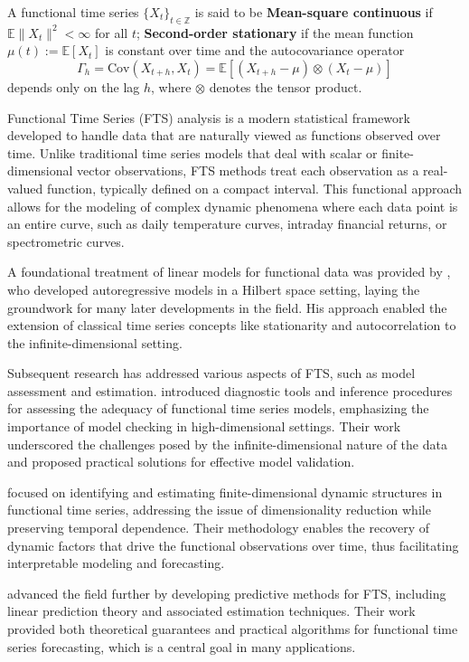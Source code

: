 \documentclass[article]{abntex2}
\begin{document}
A functional time series $\{X_t\}_{t \in \mathbb{Z}}$ is said to be \textbf{Mean-square continuous} if $\mathbb{E}\|X_t\|^2 < \infty$ for all $t$; \textbf{Second-order stationary} if the mean function $\mu(t) := \mathbb{E}[X_t]$ is constant over time and the autocovariance operator 
    \[
    \Gamma_h = \text{Cov}(X_{t+h}, X_t) = \mathbb{E}[(X_{t+h} - \mu) \otimes (X_t - \mu)]
    \]
    depends only on the lag $h$, where $\otimes$ denotes the tensor product.


Functional Time Series (FTS) analysis is a modern statistical framework developed to handle data that are naturally viewed as functions observed over time. Unlike traditional time series models that deal with scalar or finite-dimensional vector observations, FTS methods treat each observation as a real-valued function, typically defined on a compact interval. This functional approach allows for the modeling of complex dynamic phenomena where each data point is an entire curve, such as daily temperature curves, intraday financial returns, or spectrometric curves.

A foundational treatment of linear models for functional data was provided by , who developed autoregressive models in a Hilbert space setting, laying the groundwork for many later developments in the field. His approach enabled the extension of classical time series concepts like stationarity and autocorrelation to the infinite-dimensional setting.

Subsequent research has addressed various aspects of FTS, such as model assessment and estimation.  introduced diagnostic tools and inference procedures for assessing the adequacy of functional time series models, emphasizing the importance of model checking in high-dimensional settings. Their work underscored the challenges posed by the infinite-dimensional nature of the data and proposed practical solutions for effective model validation.

 focused on identifying and estimating finite-dimensional dynamic structures in functional time series, addressing the issue of dimensionality reduction while preserving temporal dependence. Their methodology enables the recovery of dynamic factors that drive the functional observations over time, thus facilitating interpretable modeling and forecasting.

 advanced the field further by developing predictive methods for FTS, including linear prediction theory and associated estimation techniques. Their work provided both theoretical guarantees and practical algorithms for functional time series forecasting, which is a central goal in many applications.
\end{document}
